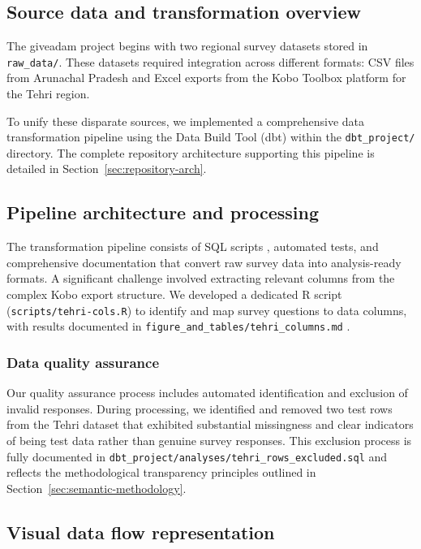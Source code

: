 \documentclass{article}
\begin{document}
\subsection{Source data and transformation overview}

The giveadam project begins with two regional survey datasets stored in \texttt{raw\_data/}. These datasets required integration across different formats: CSV files \cite{csv_rfc} from Arunachal Pradesh and Excel exports from the Kobo Toolbox \cite{kobo_toolbox} platform for the Tehri region. 

To unify these disparate sources, we implemented a comprehensive data transformation pipeline using the Data Build Tool (dbt) \cite{dbt_core,dbt_duckdb} within the \texttt{dbt\_project/} directory. The complete repository architecture supporting this pipeline is detailed in Section~\ref{sec:repository-arch}.

\subsection{Pipeline architecture and processing}

The transformation pipeline consists of SQL scripts \cite{sql}, automated tests, and comprehensive documentation that convert raw survey data into analysis-ready formats. A significant challenge involved extracting relevant columns from the complex Kobo export structure. We developed a dedicated R script \cite{r_core,tidyverse} (\texttt{scripts/tehri-cols.R}) to identify and map survey questions to data columns, with results documented in \texttt{figure\_and\_tables/tehri\_columns.md} \cite{markdown}.

\subsubsection{Data quality assurance}

Our quality assurance process includes automated identification and exclusion of invalid responses. During processing, we identified and removed two test rows from the Tehri dataset that exhibited substantial missingness and clear indicators of being test data rather than genuine survey responses. This exclusion process is fully documented in \texttt{dbt\_project/analyses/tehri\_rows\_excluded.sql} and reflects the methodological transparency principles outlined in Section~\ref{sec:semantic-methodology}.

\subsection{Visual data flow representation}
\end{document}
